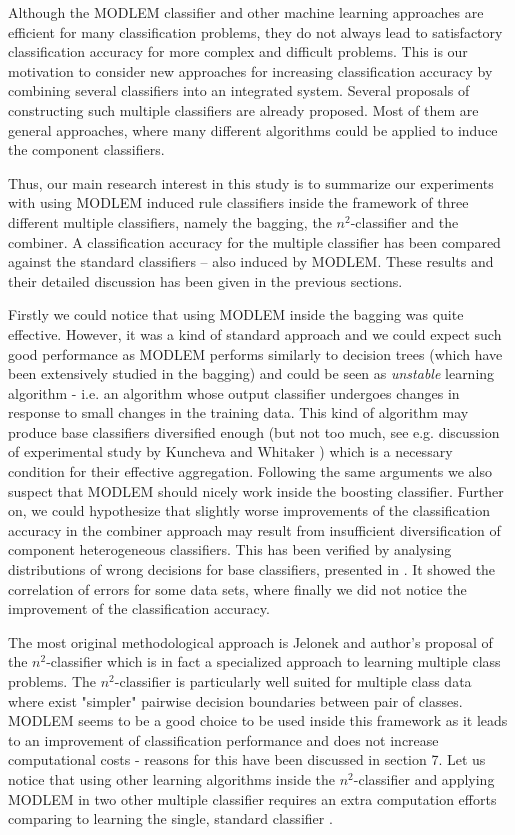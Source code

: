 \documentclass{llncs}
\begin{document}
 Although the MODLEM classifier and other machine learning
 approaches are efficient for many classification problems, they do not
 always lead to satisfactory classification
accuracy for more complex and difficult problems. This is our motivation to
consider new approaches for increasing classification accuracy by combining
several classifiers into an integrated system.
Several proposals of
constructing such multiple classifiers are already proposed. Most of them
are general approaches, where many different algorithms could be applied to
induce the component classifiers.

Thus, our main research interest in this study is to summarize our
experiments with using MODLEM induced rule classifiers inside the framework
of three different multiple classifiers, namely the bagging, the
$n^2$-classifier and the combiner. A classification accuracy for the
multiple classifier has been compared against the standard classifiers --
also induced by MODLEM. These results and their detailed discussion has been
given in the previous sections.

 Firstly we could notice that using
MODLEM inside the bagging was quite effective. However, it was a kind of
standard approach and we could expect such good performance as MODLEM
performs similarly to decision trees (which have been extensively studied in
the bagging) and could be seen as {\it unstable} learning algorithm - i.e.
an algorithm whose output classifier undergoes changes in response to small
changes in the training data. This kind of algorithm may produce base
classifiers diversified enough (but not too much, see e.g. discussion of
experimental study by Kuncheva and Whitaker \cite{KunchWhit}) which is a
necessary condition for their effective aggregation. Following the same
arguments we also suspect that MODLEM should nicely work inside the boosting
classifier. Further on, we could hypothesize that slightly worse
improvements of the classification accuracy in the combiner approach may
result from insufficient diversification of component heterogeneous
classifiers. This has been verified by analysing distributions of wrong
decisions for base classifiers, presented in \cite{nowaczyk}. It showed the
correlation of errors for some data sets, where finally we did not notice
the improvement of the classification accuracy.

The most original methodological approach is Jelonek and author's proposal
of the $n^2$-classifier which is in fact a specialized approach to learning
multiple class problems. The $n^2$-classifier is particularly well suited
for multiple class data where exist "simpler" pairwise decision boundaries
between pair of classes. MODLEM seems to be a good choice to be used inside
this framework as it leads to an improvement of classification performance
and does not increase computational costs - reasons for this have been
discussed in section 7. Let us notice that using other learning algorithms
inside  the $n^2$-classifier and applying MODLEM in two other multiple
classifier requires an extra computation  efforts comparing to learning the
single, standard classifier \cite{Uppsala}.
\end{document}

